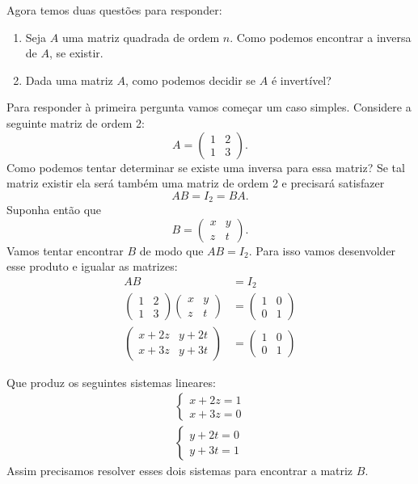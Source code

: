 Agora temos duas questões para responder:
\begin{enumerate}[label={\arabic*})]
    \item Seja $A$ uma matriz quadrada de ordem $n$. Como podemos encontrar a inversa de $A$, se existir.

    \item Dada uma matriz $A$, como podemos decidir se $A$ é invertível?
\end{enumerate}

Para responder à primeira pergunta vamos começar um caso simples. Considere a seguinte matriz de ordem 2:
\[
    A = \begin{pmatrix}
        1 & 2\\1 & 3
    \end{pmatrix}.
\]
Como podemos tentar determinar se existe uma inversa para essa matriz? Se tal matriz existir ela será também uma matriz de ordem 2 e precisará satisfazer
\[
    AB = I_2 = BA.
\]
Suponha então que
\[
    B = \begin{pmatrix}
        x & y\\z & t
    \end{pmatrix}.
\]
Vamos tentar encontrar $B$ de modo que $AB = I_2$. Para isso vamos desenvolder esse produto e igualar as matrizes:
\begin{align*}
    AB &= I_2\\
    \begin{pmatrix}1 & 2\\1 & 3\end{pmatrix}\begin{pmatrix}x & y\\z & t\end{pmatrix} &= \begin{pmatrix}1 & 0\\0 & 1\end{pmatrix}\\
    \begin{pmatrix}x + 2z & y + 2t\\x + 3z & y + 3t\end{pmatrix} &= \begin{pmatrix}1 & 0\\0 & 1\end{pmatrix}
\end{align*}

Que produz os seguintes sistemas lineares:
\begin{align}
    \begin{cases}\label{primeirosistema}
        x + 2z = 1\\
        x + 3z = 0
    \end{cases}\\
    \begin{cases}\label{segundosistema}
        y + 2t = 0\\
        y + 3t = 1
    \end{cases}
\end{align}
Assim precisamos resolver esses dois sistemas para encontrar a matriz $B$.

